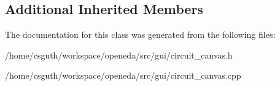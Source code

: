 \subsection*{Additional Inherited Members}


The documentation for this class was generated from the following files\-:\begin{DoxyCompactItemize}
\item 
/home/csguth/workspace/openeda/src/gui/circuit\-\_\-canvas.\-h\item 
/home/csguth/workspace/openeda/src/gui/circuit\-\_\-canvas.\-cpp\end{DoxyCompactItemize}
